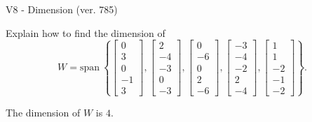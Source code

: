 \begin{exercise}
  \begin{exerciseTitle}V8 - Dimension (ver. 785)\end{exerciseTitle}
  \begin{exerciseStatement}
    Explain how to find the dimension of 
\[W=\mathrm{span}\ \left\{\left[\begin{array}{r}
0 \\
3 \\
0 \\
-1 \\
3
\end{array}\right] , \left[\begin{array}{r}
2 \\
-4 \\
-3 \\
0 \\
-3
\end{array}\right] , \left[\begin{array}{r}
0 \\
-6 \\
0 \\
2 \\
-6
\end{array}\right] , \left[\begin{array}{r}
-3 \\
-4 \\
-2 \\
2 \\
-4
\end{array}\right] , \left[\begin{array}{r}
1 \\
1 \\
-2 \\
-1 \\
-2
\end{array}\right]\right\}.\]



  \end{exerciseStatement}
  \begin{exerciseAnswer}
   The dimension of \(W\) is  \(4\).
  


  \end{exerciseAnswer}
\end{exercise}